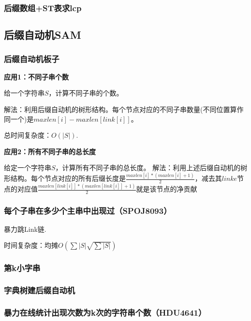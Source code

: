 \documentclass{article}
\begin{document}
\subsubsection{后缀数组+ST表求lcp}



\subsection{后缀自动机SAM}
\subsubsection{后缀自动机板子}
\textbf{应用1：不同子串个数}\par
给一个字符串$S$，计算不同子串的个数。\par
解法：利用后缀自动机的树形结构。每个节点对应的不同子串数量(不同位置算作同一个)是$maxlen[i]-maxlen[link[i]]$。\par
总时间复杂度：$O(|S|)$.\par
\textbf{应用2：所有不同子串的总长度}\par
给定一个字符串$S$，计算所有不同子串的总长度。
解法：利用上述后缀自动机的树形结构。每个节点对应的所有后缀长度是$\frac{maxlen[i]\ast (maxlen[i]+1)}{2}$，减去其$linke$节点的对应值$\frac{maxlen[link[i]]\ast (maxlen[link[i]]+1)}{2}$就是该节点的净贡献

\subsubsection{每个子串在多少个主串中出现过（SPOJ8093）}
暴力跳Link链.\par
时间复杂度：$均摊O(\sum |S|\sqrt{\sum |S|})$

\subsubsection{第k小字串}

\subsubsection{字典树建后缀自动机}

\subsubsection{暴力在线统计出现次数为k次的字符串个数（HDU4641）}

\end{document}
